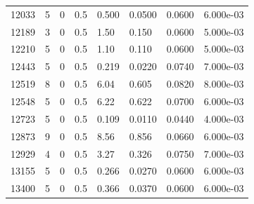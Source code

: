 \documentclass[preview]{standalone}
\begin{document}
{{{{\begin{tabular}{L{1.2cm}C{1.2cm} C{0.3cm}C{0.5cm} C{1.4cm}C{1.4cm} C{1.4cm}C{1.4cm}}
  12033  &     5  & 0     & 0.5 &  0.500  & 0.0500  & 0.0600 &  6.000e-03   \\ 
  12189  &     3  & 0     & 0.5 &  1.50  & 0.150  & 0.0600 &  5.000e-03   \\ 
  12210  &     5  & 0     & 0.5 &  1.10  & 0.110  & 0.0600 &  5.000e-03   \\ 
  12443  &     5  & 0     & 0.5 &  0.219  & 0.0220  & 0.0740 &  7.000e-03   \\ 
  12519  &     8  & 0     & 0.5 &  6.04  & 0.605  & 0.0820 &  8.000e-03   \\ 
  12548  &     5  & 0     & 0.5 &  6.22  & 0.622  & 0.0700 &  6.000e-03   \\ 
  12723  &     5  & 0     & 0.5 &  0.109  & 0.0110  & 0.0440 &  4.000e-03   \\ 
  12873  &     9  & 0     & 0.5 &  8.56  & 0.856  & 0.0660 &  6.000e-03   \\ 
  12929  &     4  & 0     & 0.5 &  3.27  & 0.326  & 0.0750 &  7.000e-03   \\ 
  13155  &     5  & 0     & 0.5 &  0.266  & 0.0270  & 0.0600 &  6.000e-03   \\ 
  13400  &     5  & 0     & 0.5 &  0.366  & 0.0370  & 0.0600 &  6.000e-03   \\ 
\hline 
\end{tabular} 

}}}}
\end{document}
